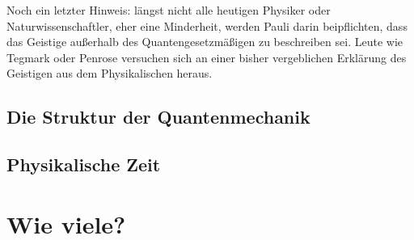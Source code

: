 \documentclass[12pt]{book}
\begin{document}
Noch ein letzter Hinweis: längst nicht alle heutigen Physiker oder Naturwissenschaftler, eher eine Minderheit, werden Pauli darin beipflichten, dass das Geistige außerhalb des Quantengesetzmäßigen zu beschreiben sei. Leute wie Tegmark oder Penrose versuchen sich an einer bisher vergeblichen Erklärung des Geistigen aus dem Physikalischen heraus.

\section{Die Struktur der Quantenmechanik}

\section{Physikalische Zeit}

\chapter{Wie viele?}
\end{document}
